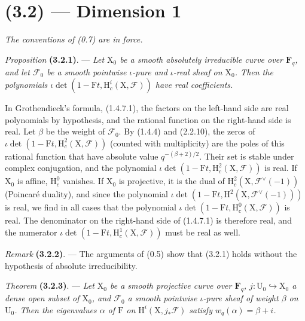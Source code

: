 \documentclass[11pt,leqno]{article}
\newcommand{\Page}[1]{\ifvmode\noindent\else\unskip\ \fi{\footnotesize\textcolor{gray}{[p.\,#1]}}\ \ignorespaces}
\begin{document}
\section*{(3.2) — Dimension 1}

\textit{The conventions of \textup{(0.7)} are in force.}

\textit{Proposition} \textbf{(3.2.1)}. — \textit{Let \(\mathrm X_0\) be a smooth absolutely irreducible curve over \(\mathbf F_q\), and let \(\mathscr F_0\) be a smooth pointwise \(\iota\)-pure and \(\iota\)-real sheaf on \(\mathrm X_0\). Then the polynomials \(\iota\det(1-\mathrm F t,\mathrm H_c^i(\mathrm X,\mathscr F))\) have real coefficients.}

In Grothendieck’s formula, (1.4.7.1), the factors on the left-hand side are real polynomials by hypothesis, and the rational function on the right-hand side is real. Let \(\beta\) be the weight of \(\mathscr F_0\). By (1.4.4) and (2.2.10), the zeros of \(\iota\det(1-\mathrm F t,\mathrm H_c^2(\mathrm X,\mathscr F))\) (counted with multiplicity) are the poles of this rational function that have absolute value \(q^{-(\beta+2)/2}\). Their set is stable under complex conjugation, and the polynomial \(\iota\det(1-\mathrm F t,\mathrm H_c^2(\mathrm X,\mathscr F))\) is real. If \(\mathrm X_0\) is affine, \(\mathrm H_c^0\) vanishes. If \(\mathrm X_0\) is projective, it is the dual of \(\mathrm H_c^2(\mathrm X,\mathscr F^\vee(-1))\) (Poincaré duality), and since the polynomial \(\iota\det(1-\mathrm F t,\mathrm H^2(\mathrm X,\mathscr F^\vee(-1)))\) is real, we find in all cases that the polynomial \(\iota\det(1-\mathrm F t,\mathrm H_c^0(\mathrm X,\mathscr F))\) is real. The denominator on the right-hand side of (1.4.7.1) is therefore real, and the numerator \(\iota\det(1-\mathrm F t,\mathrm H_c^1(\mathrm X,\mathscr F))\) must be real as well.

\textit{Remark} \textbf{(3.2.2)}. — The arguments of (0.5) show that (3.2.1) holds without the hypothesis of absolute irreducibility.

\textit{Theorem} \textbf{(3.2.3)}. — \textit{Let \(\mathrm X_0\) be a smooth projective curve over \(\mathbf F_q\), \(j:\mathrm U_0\hookrightarrow\mathrm X_0\) a dense open subset of \(\mathrm X_0\), and \(\mathscr F_0\) a smooth pointwise \(\iota\)-pure sheaf of weight \(\beta\) on \(\mathrm U_0\). Then the eigenvalues \(\alpha\) of \(\mathrm F\) on \(\mathrm H^i(\mathrm X,j_*\mathscr F)\) satisfy \(w_q(\alpha)=\beta+i\).}

\Page{201}
\end{document}
